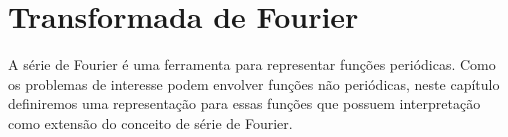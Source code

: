 
\chapter{Transformada de Fourier}{\label{trans_Fourier}} %

A série de Fourier é uma ferramenta para representar funções periódicas. Como os problemas de interesse podem envolver fun\c{c}\~{o}es n\~{a}o peri\'{o}dicas, neste cap\'{i}tulo definiremos uma representa\c{c}\~{a}o para essas fun\c{c}\~{o}es que possuem interpreta\c{c}\~{a}o como extens\~{a}o do conceito de s\'{e}rie de Fourier.

